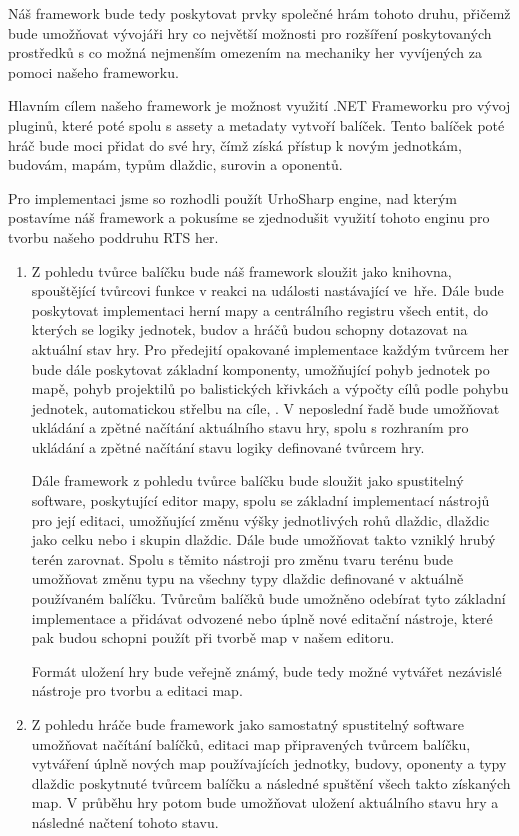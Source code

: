 Náš framework bude tedy poskytovat prvky společné hrám tohoto druhu, přičemž bude umožňovat vývojáři hry co největší možnosti pro rozšíření poskytovaných prostředků s 
co možná nejmenším omezením na mechaniky her vyvíjených za pomoci našeho frameworku.
 
Hlavním cílem našeho framework je možnost využití .NET Frameworku pro vývoj pluginů, které poté spolu s assety a metadaty vytvoří balíček. Tento balíček poté hráč bude moci přidat do své hry, čímž získá přístup k novým jednotkám, budovám, mapám, typům dlaždic, surovin a oponentů. 

Pro implementaci jsme so rozhodli použít UrhoSharp engine, nad kterým postavíme náš framework a pokusíme se zjednodušit využití tohoto enginu pro tvorbu našeho poddruhu RTS her. 
\begin{enumerate}
	\item Z pohledu tvůrce balíčku bude náš framework sloužit jako knihovna, spouštějící tvůrcovi funkce v reakci na události nastávající ve~hře. Dále bude poskytovat implementaci herní mapy a centrálního registru všech entit, do kterých se logiky jednotek, budov a hráčů budou schopny dotazovat na aktuální stav hry. Pro předejití opakované implementace každým tvůrcem her bude dále poskytovat základní komponenty, umožňující pohyb jednotek po mapě, pohyb projektilů po balistických křivkách a výpočty cílů podle pohybu jednotek, automatickou střelbu na cíle, . V neposlední řadě bude umožňovat ukládání a zpětné načítání aktuálního stavu hry, spolu s rozhraním pro ukládání a zpětné načítání stavu logiky definované tvůrcem hry. 
	
	Dále framework z pohledu tvůrce balíčku bude sloužit jako spustitelný software, poskytující editor mapy, spolu se základní implementací nástrojů pro její editaci, umožňující změnu výšky jednotlivých rohů dlaždic, dlaždic jako celku nebo i skupin dlaždic. Dále bude umožňovat takto vzniklý hrubý terén zarovnat. Spolu s těmito nástroji pro změnu tvaru terénu bude umožňovat změnu typu na všechny typy dlaždic definované v aktuálně používaném balíčku. Tvůrcům balíčků bude umožněno odebírat tyto základní implementace a přidávat odvozené nebo úplně nové editační nástroje, které pak budou schopni použít při tvorbě map v našem editoru.
	
	Formát uložení hry bude veřejně známý, bude tedy možné vytvářet nezávislé nástroje pro tvorbu a editaci map. 
	\item
	Z pohledu hráče bude framework jako samostatný spustitelný software umožňovat načítání balíčků, editaci map připravených tvůrcem balíčku, vytváření úplně nových map používajících jednotky, budovy, oponenty a typy dlaždic poskytnuté tvůrcem balíčku a následné spuštění všech takto získaných map. V průběhu hry potom bude umožňovat uložení aktuálního stavu hry a následné načtení tohoto stavu.
\end{enumerate}




